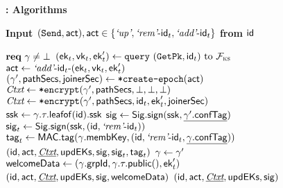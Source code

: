 \begin{figure*}[!p]
\begin{anybox}{\sffamily\bfseries \saik : Algorithms}
\begin{minipage}[t]{0.48\linewidth}
        \medskip
        {\bf Input $(\keyword{Send}, \hgact), \hgact \in \{\hglu , \hglr\md\id_t, \hgla\md\id_t\}$ from $\id$}
				\begin{algorithmic}
					\State $\KwReq\ \itkSt \neq \bot$
          \State \vspace*{-.5em}
            \State $(\mmpkepk_t, \rsvk_t, \mmpkepk_t') \gets \KwQuery\ (\keyword{GetPk},\id_t) \text{ to } \funcKB$
            \State $\hgact \gets \hgla\md\id_t\md(\mmpkepk_t, \rsvk_t,\mmpkepk_t')$
          \EndIf
          \State {}
          \State \KwTry{} $(\itkSt', \pathSecrets, \joinerSecret)  \gets\provState(\hgact)$
          \State {}
            \State $\pathSecCtxt \gets \encSecrets(\itkSt', \pathSecrets, \bot, \bot, \bot)$
            \State $\pathSecCtxt \gets \encSecrets(\itkSt', \pathSecrets, \id_t, \mmpkepk_t', \joinerSecret)$
          \EndIf
          \State $\ssk \gets \itkSt.\tree.\leafof(\id).\ssk$
          \State  $\sig \gets \sigsign(\ssk, \underline{\itkSt'.\confTag})$
            \State {}
            \State $\sig_t \gets \sigsign(\ssk, (\id, \hglr\md\id_t))$
            \State $\macsig_t \gets \mactag(\itkSt.\membershipKey, (\id, \hglr\md\id_t, \underline{\itkSt.\confTag}))$
            \State \Return $(\id, \hgact, \underline{\pathSecCtxt}, \updatedPks, \sig, \sig_t, \macsig_t)$
          \EndIf
          \State $\itkSt \gets \itkSt'$
            \State {}
            \State $\variable{welcomeData} \gets (\itkSt.\groupId, \itkSt.\tree.\public(), \mmpkepk_t')$
            \State \Return $(\id, \hgact, \underline{\pathSecCtxt}, \updatedPks, \sig, \variable{welcomeData})$
          \EndIf
          \State \Return $(\id, \hgact, \underline{\pathSecCtxt}, \updatedPks, \sig)$
				\end{algorithmic}


\end{minipage}
\end{anybox}
\end{figure*}
